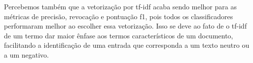 Percebemos também que a vetorização por tf-idf acaba sendo melhor para as métricas
de precisão, revocação e pontuação f1, pois todos os classificadores performaram
melhor ao escolher essa vetorização. Isso se deve ao fato de o tf-idf de um termo
dar maior ênfase aos termos característicos de um documento, facilitando a identificação
de uma entrada que corresponda a um texto neutro ou a um negativo.